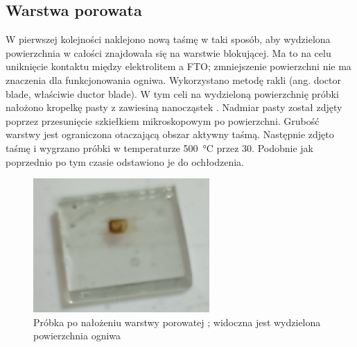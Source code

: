\documentclass[12pt]{article}
\begin{document}
	\subsection{Warstwa porowata }
	W pierwszej kolejności naklejono nową taśmę w taki sposób, aby wydzielona powierzchnia w całości znajdowała się na warstwie blokującej. Ma to na celu uniknięcie kontaktu między elektrolitem a FTO; zmniejszenie powierzchni nie ma znaczenia dla funkcjonowania ogniwa. Wykorzystano metodę rakli (ang. doctor blade, właściwie ductor blade). W tym celi na wydzieloną powierzchnię próbki nałożono kropelkę pasty z zawiesiną nanocząstek . Nadmiar pasty został zdjęty poprzez przesunięcie szkiełkiem mikroskopowym po powierzchni. Grubość warstwy jest ograniczona otaczającą obszar aktywny taśmą. Następnie zdjęto taśmę i wygrzano próbki w temperaturze \qty{500}{\degreeCelsius} przez \qty{30}{\min}. Podobnie jak poprzednio po tym czasie odstawiono je do ochłodzenia. 
	\begin{figure}[H]
		\centering
		\includegraphics[width=0.6\textwidth]{probki_tio2_poro.png}
		\caption{Próbka po nałożeniu warstwy porowatej ; widoczna jest wydzielona powierzchnia ogniwa}
	\end{figure}
	
\end{document}
